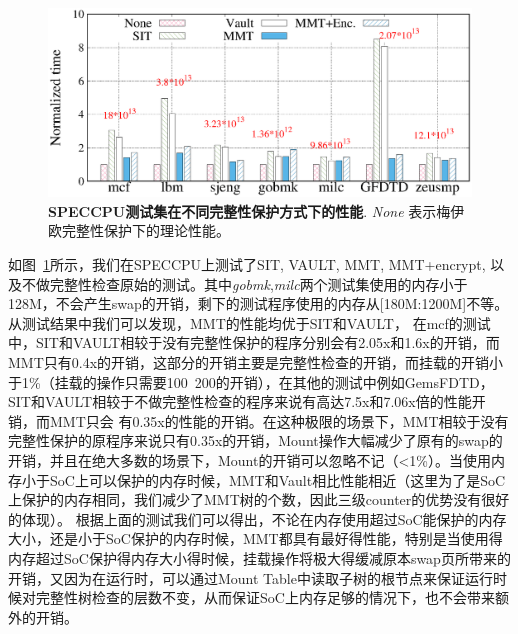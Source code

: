 \begin{figure}[hbt]
    \centering
    \setlength{\belowcaptionskip}{0pt}
    \includegraphics[scale=0.6]{fig/eval-integrity-bench.eps}
    \caption{\textbf{SPECCPU测试集在不同完整性保护方式下的性能}. \emph{None} 表示梅伊欧完整性保护下的理论性能。}
    \label{fig:eval-inter-bench}
\end{figure}
如图~\ref{fig:eval-inter-bench}所示，我们在SPECCPU上测试了SIT, VAULT, MMT, MMT+encrypt, 以及不做完整性检查原始的测试。其中\emph{gobmk},\emph{milc}两个测试集使用的内存小于128M，不会产生swap的开销，剩下的测试程序使用的内存从[180M:1200M]不等。从测试结果中我们可以发现，MMT的性能均优于SIT和VAULT，
在mcf的测试中，SIT和VAULT相较于没有完整性保护的程序分别会有2.05x和1.6x的开销，而MMT只有0.4x的开销，这部分的开销主要是完整性检查的开销，而挂载的开销小于1\%（挂载的操作只需要100~200的开销），在其他的测试中例如GemsFDTD，SIT和VAULT相较于不做完整性检查的程序来说有高达7.5x和7.06x倍的性能开销，而MMT只会
有0.35x的性能的开销。在这种极限的场景下，MMT相较于没有完整性保护的原程序来说只有0.35x的开销，Mount操作大幅减少了原有的swap的开销，并且在绝大多数的场景下，Mount的开销可以忽略不记（<1\%）。当使用内存小于SoC上可以保护的内存时候，MMT和Vault相比性能相近（这里为了是SoC上保护的内存相同，我们减少了MMT树的个数，因此三级counter的优势没有很好的体现）。
根据上面的测试我们可以得出，不论在内存使用超过SoC能保护的内存大小，还是小于SoC保护的内存时候，MMT都具有最好得性能，特别是当使用得内存超过SoC保护得内存大小得时候，挂载操作将极大得缓减原本swap页所带来的开销，又因为在运行时，可以通过Mount Table中读取子树的根节点来保证运行时候对完整性树检查的层数不变，从而保证SoC上内存足够的情况下，也不会带来额外的开销。


